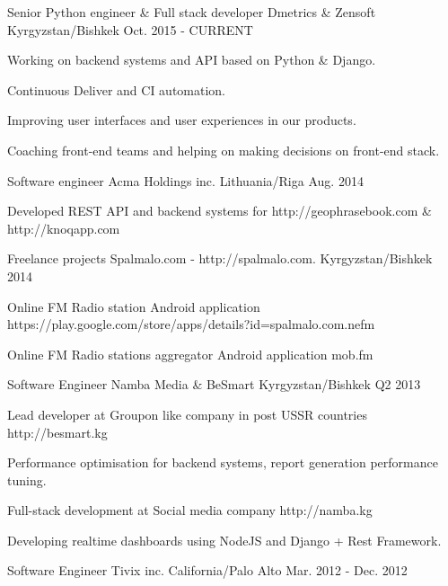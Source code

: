 \begin{cventries}
  \cventry
    {Senior Python engineer \& Full stack developer}
    {Dmetrics \& Zensoft}
    {Kyrgyzstan/Bishkek}
    {Oct. 2015 - CURRENT}
    {
      \begin{cvitems}
        \item {Working on backend systems and API based on Python \& Django.}
        \item {Continuous Deliver and CI automation.}
        \item {Improving user interfaces and user experiences in our products.}
        \item {Coaching front-end teams and helping on making decisions on front-end stack.}
      \end{cvitems}
    }
  \cventry
    {Software engineer}
    {Acma Holdings inc.}
    {Lithuania/Riga}
    {Aug. 2014}
    {
      \begin{cvitems}
        \item {Developed REST API and backend systems for http://geophrasebook.com \& http://knoqapp.com}
      \end{cvitems}
    }
  \cventry
    {Freelance projects}
    {Spalmalo.com - http://spalmalo.com.}
    {Kyrgyzstan/Bishkek}
    {2014}
    {
      \begin{cvitems}
        \item {Online FM Radio station Android application https://play.google.com/store/apps/details?id=spalmalo.com.nefm}
        \item {Online FM Radio stations aggregator Android application mob.fm}
      \end{cvitems}
    }
  \cventry
    {Software Engineer}
    {Namba Media \& BeSmart}
    {Kyrgyzstan/Bishkek}
    {Q2 2013}
    {
      \begin{cvitems}
        \item {Lead developer at Groupon like company in post USSR countries http://besmart.kg}
        \item {Performance optimisation for backend systems, report generation performance tuning.}
        \item {Full-stack development at Social media company http://namba.kg}
        \item {Developing realtime dashboards using NodeJS and Django + Rest Framework.}
      \end{cvitems}
    }
  \cventry
    {Software Engineer}
    {Tivix inc.}
    {California/Palo Alto}
    {Mar. 2012 - Dec. 2012}
    {
}
\end{cventries}
